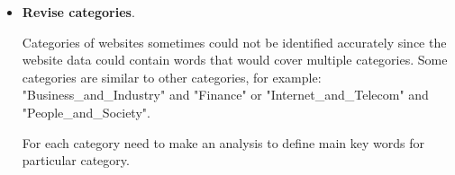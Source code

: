 \begin{itemize}
    \item \textbf{Revise categories}. 
    
    Categories of websites sometimes could not be identified accurately since the website data could contain words that would cover multiple categories. Some categories are similar to other categories, for example: "Business\_and\_Industry" and "Finance" or "Internet\_and\_Telecom" and "People\_and\_Society". 
    
    For each category need to make an analysis to define main key words for particular category.

\end{itemize}
